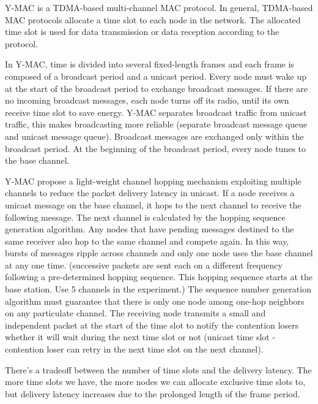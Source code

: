 Y-MAC is a TDMA-based multi-channel MAC protocol. In general, TDMA-based MAC protocols allocate a time slot to each node in the network. The allocated time slot is used for data transmission or data reception according to the protocol.

In Y-MAC, time is divided into several fixed-length frames and each frame is composed of a broadcast period and a unicast period. Every node must wake up at the start of the broadcast period to exchange broadcast messages. If there are no incoming broadcast messages, each node turns off its radio, until its own receive time slot to save energy. Y-MAC separates broadcast traffic from unicast traffic, this makes broadcasting more reliable (separate broadcast message queue and unicast message queue). Broadcast messages are exchanged only within the broadcast period. At the beginning of the broadcast period, every node tunes to the base channel. 

Y-MAC propose a light-weight channel hopping mechanism exploiting multiple channels to reduce the packet delivery latency in unicast. If a node receives a unicast message on the base channel, it hops to the next channel to receive the following message. The next channel is calculated by the hopping sequence generation algorithm. Any nodes that have pending messages destined to the same receiver also hop to the same channel and compete again. In this way, bursts of messages ripple across channels and only one node uses the base channel at any one time. (successive packets are sent each on a different frequency following a pre-determined hopping sequence. This hopping sequence starts at the base station. Use 5 channels in the experiment.) The sequence number generation algorithm must guarantee that there is only one node among one-hop neighbors on any particulate channel. The receiving node transmits a small and independent packet at the start of the time slot to notify the contention losers whether it will wait during the next time slot or not (unicast time slot - contention loser can retry in the next time slot on the next channel). 

There's a tradeoff between the number of time slots and the delivery latency. The more time slots we have, the more nodes we can allocate exclusive time slots to, but delivery latency increases due to the prolonged length of the frame period. 

